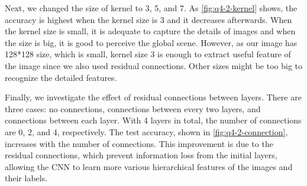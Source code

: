 Next, we changed the size of kernel to 3, 5, and 7. As \cref{fig:q4-2-kernel} shows, the accuracy is highest when the kernel size is 3 and it decreases afterwards. When the kernel size is small, it is adequate to capture the details of images and when the size is big, it is good to perceive the global scene. However, as our image has 128*128 size, which is small, kernel size 3 is enough to extract useful feature of the image since we also used residual connections. Other sizes might be too big to recognize the detailed features.

Finally, we investigate the effect of residual connections between layers. There are three cases: no connections, connections between every two layers, and connections between each layer. With 4 layers in total, the number of connections are 0, 2, and 4, respectively. The test accuracy, shown in \cref{fig:q4-2-connection}, increases with the number of connections. This improvement is due to the residual connections, which prevent information loss from the initial layers, allowing the CNN to learn more various hierarchical features of the images and their labels.

